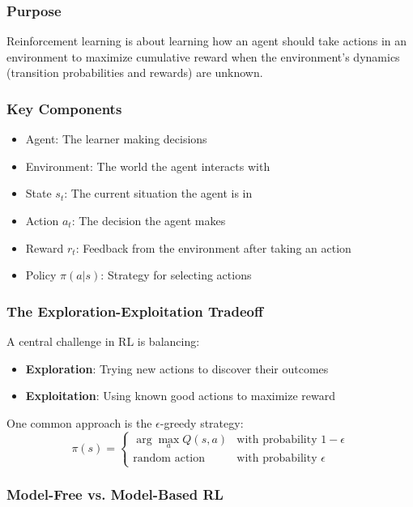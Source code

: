 \documentclass{article}
\begin{document}
\subsubsection{Purpose}
Reinforcement learning is about learning how an agent should take actions in an environment to maximize cumulative reward when the environment's dynamics (transition probabilities and rewards) are unknown.

\subsubsection{Key Components}
\begin{itemize}
    \item Agent: The learner making decisions
    \item Environment: The world the agent interacts with
    \item State $s_t$: The current situation the agent is in
    \item Action $a_t$: The decision the agent makes
    \item Reward $r_t$: Feedback from the environment after taking an action
    \item Policy $\pi(a|s)$: Strategy for selecting actions
\end{itemize}

\subsubsection{The Exploration-Exploitation Tradeoff}
A central challenge in RL is balancing:
\begin{itemize}
    \item \textbf{Exploration}: Trying new actions to discover their outcomes
    \item \textbf{Exploitation}: Using known good actions to maximize reward
\end{itemize}

One common approach is the $\epsilon$-greedy strategy:
\begin{equation}
    \pi(s) = 
    \begin{cases}
        \arg\max_a Q(s,a) & \text{with probability } 1-\epsilon \\
        \text{random action} & \text{with probability } \epsilon
    \end{cases}
\end{equation}

\subsubsection{Model-Free vs. Model-Based RL}
\end{document}
